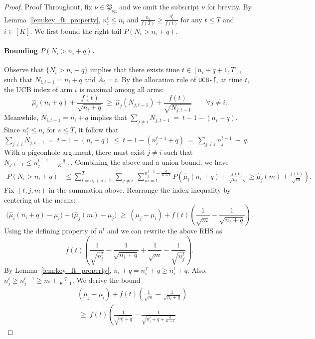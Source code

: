 \documentclass[nonblindrev]{informs3_noinforms}
\begin{document}
\begin{proof}{Proof}
Throughout, fix $\nu \in \mathfrak{P}_{\text{sg}}$ and we omit the subscript $\nu$ for brevity. By Lemma~\ref{lem:key_ft_property}, $n_i^t \le n_i$ and $\frac{n_i}{f(T)} \ge \frac{n_i^t}{f(t)}$ for any $t \le T$ and $i \in [K].$ We first bound the right tail $P(N_i > n_i + q)$.
\paragraph{Bounding $P(N_i > n_i + q)$.} Observe that  $\{N_i > n_i +  q \}$ implies that there exists time $ t \in [n_i + q +1, T]$, such that $N_{i, t-1} = n_i + q$ and $A_{t} = i$. By the allocation rule of \texttt{UCB-f}, at time $t$, the UCB index of arm $i$ is maximal among all arms:
\[
\widehat\mu_i(n_i+q)+\frac{f(t)}{\sqrt{n_i+q}}
\ \ge\
\widehat\mu_j(N_{j,t-1})+\frac{f(t)}{\sqrt{N_{j,t-1}}}
\qquad \forall j\neq i.
\]
Meanwhile, $N_{i, t-1} = n_i +  q$ implies that $\sum_{j\neq i} N_{j,t-1} \ =\ t - 1 - (n_i+q).$ Since $n_i^s \le n_i$ for $s \le T$, it follow that $\sum_{j\neq i} N_{j,t-1}
\ =\ t - 1 - (n_i+q)
\ \le\ t-1 -(n_i^{t-1}+q)
\ =\ \sum_{j\neq i} n_j^{t-1}\ -\ q.$ With a pigeonhole argument, there must exist $j \ne i$ such that $N_{j, t-1} \le n_j^{t-1} - \frac{q}{K - 1}.$ Combining the above and a union bound, we have 
\begin{align}
P(N_i > n_i+q)
&\le \sum_{t=n_i+q+1}^{T}\ \sum_{j\neq i}\ \sum_{m= 1}^{n_j^{t-1}-\frac{q}{K-1}}
P\!\left(
\widehat\mu_i(n_i+q)+\frac{f(t)}{\sqrt{n_i+q}}
\ge
\widehat\mu_j(m)+\frac{f(t)}{\sqrt{m}}
\right).
\label{eq:right_tail_reduce}
\end{align}
Fix $(t,j,m)$ in the summation above.
Rearrange the index inequality by centering at the means:
\[
\big(\widehat\mu_i(n_i+q)-\mu_i\big) - \big(\widehat\mu_j(m)-\mu_j\big)
\ \ge\
(\mu_j-\mu_i) + f(t)\!\left(\frac{1}{\sqrt{m}}-\frac{1}{\sqrt{n_i+q}}\right).
\]
Using the defining property of $n^t$ and we can rewrite the above RHS as 
\[
f(t)\!\left(
\frac{1}{\sqrt{n_i^{t}}}-\frac{1}{\sqrt{n_i+q}}
+\frac{1}{\sqrt{m}}-\frac{1}{\sqrt{n_j^{t}}}
\right).
\]
By Lemma~\ref{lem:key_ft_property}, $n_i + q = n_i^T + q \ge n_i^{t} + q$. Also, $n_j^{t} \ge n_j^{t-1} \ge m + \frac{q}{K-1}$. We derive the bound
\begin{align}
&(\mu_j-\mu_i) + f(t)\!\left(\frac{1}{\sqrt{m}}-\frac{1}{\sqrt{n_i+q}}\right)\nonumber\\
& \ \ge\ 
f(t)\!\left(
\frac{1}{\sqrt{n_i^{t}+q}}-\frac{1}{\sqrt{n_i^{t}+q+\frac{q}{K-1}}}

\end{align}
\end{proof}
\end{document}

